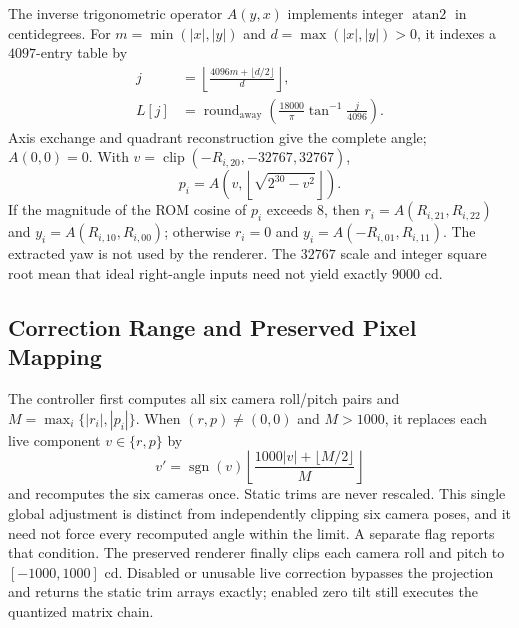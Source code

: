 The inverse trigonometric operator $A(y,x)$ implements integer
$\operatorname{atan2}$ in centidegrees. For $m=\min(|x|,|y|)$ and
$d=\max(|x|,|y|)>0$, it indexes a $4097$-entry table by
\begin{equation}
 \begin{aligned}
 j&=\left\lfloor\frac{4096m+\lfloor d/2\rfloor}{d}\right\rfloor,\\
 L[j]&=\operatorname{round}_{\mathrm{away}}
       \left(\frac{18000}{\pi}\tan^{-1}\frac{j}{4096}\right).
 \end{aligned}
\end{equation}
Axis exchange and quadrant reconstruction give the complete angle;
$A(0,0)=0$. With $v=\operatorname{clip}(-R_{i,20},-32767,32767)$,
\begin{equation}
 p_i=A\!\left(v,\left\lfloor\sqrt{2^{30}-v^2}\right\rfloor\right).
\end{equation}
If the magnitude of the ROM cosine of $p_i$ exceeds $8$, then
$r_i=A(R_{i,21},R_{i,22})$ and
$y_i=A(R_{i,10},R_{i,00})$; otherwise $r_i=0$ and
$y_i=A(-R_{i,01},R_{i,11})$. The extracted yaw is not used by the renderer.
The $32767$ scale and integer square root mean that ideal right-angle
inputs need not yield exactly $9000$ cd.

\subsection{Correction Range and Preserved Pixel Mapping}
The controller first computes all six camera roll/pitch pairs and
$M=\max_i\{|r_i|,|p_i|\}$. When $(r,p)\ne(0,0)$ and $M>1000$, it replaces
each live component $v\in\{r,p\}$ by
\begin{equation}
 v'=\operatorname{sgn}(v)
   \left\lfloor\frac{1000|v|+\lfloor M/2\rfloor}{M}\right\rfloor
 \label{eq:gl_global_scale}
\end{equation}
and recomputes the six cameras once. Static trims are never rescaled.
This single global adjustment is distinct from independently clipping six
camera poses, and it need not force every recomputed angle within the limit.
A separate flag reports that condition. The preserved renderer finally
clips each camera roll and pitch to $[-1000,1000]$ cd. Disabled or unusable
live correction bypasses the projection and returns the static trim arrays
exactly; enabled zero tilt still executes the quantized matrix chain.

